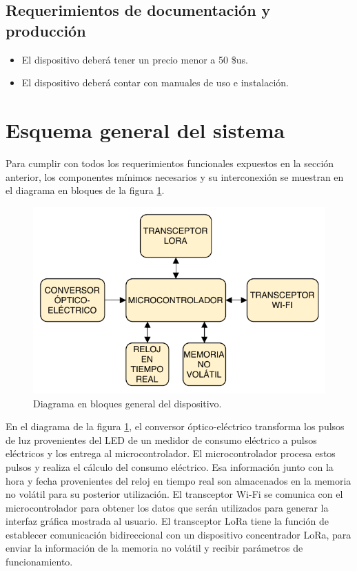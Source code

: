 \subsection{Requerimientos de documentación y producción}

\begin{itemize}
	\item El dispositivo deberá tener un precio menor a 50 \$us.
	\item El dispositivo deberá contar con manuales de uso e instalación.
\end{itemize}


\section{Esquema general del sistema}

Para cumplir con todos los requerimientos funcionales expuestos en la sección anterior, los componentes mínimos necesarios y su interconexión se muestran en el diagrama en bloques de la figura \ref{fig:diagramBlocks}.

\begin{figure}[h]
	\centering
	\includegraphics[scale=1]{./Figures/general_blocks.pdf}
	\caption{Diagrama en bloques general del dispositivo.}
	\label{fig:diagramBlocks}
\end{figure}

En el diagrama de la figura \ref{fig:diagramBlocks}, el conversor óptico-eléctrico transforma los pulsos de luz provenientes del LED de un  medidor de consumo eléctrico a pulsos eléctricos y los entrega al microcontrolador. El microcontrolador procesa estos pulsos y realiza el cálculo del consumo eléctrico. Esa información junto con la hora y fecha provenientes del reloj en tiempo real son almacenados en la memoria no volátil para su posterior utilización. El transceptor Wi-Fi se comunica con el microcontrolador para obtener los datos que serán utilizados para generar la interfaz gráfica mostrada al usuario. El transceptor LoRa tiene la función de establecer comunicación bidireccional con un dispositivo concentrador LoRa, para enviar la información de la memoria no volátil y recibir parámetros de funcionamiento.

